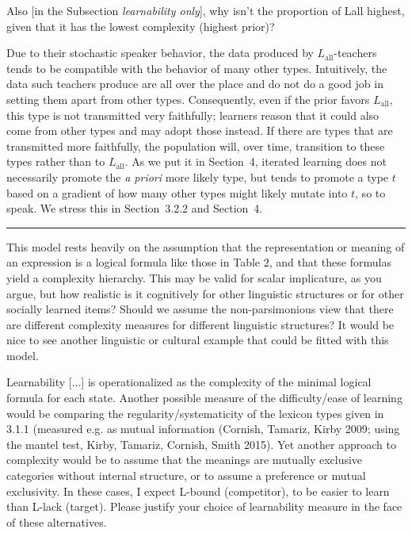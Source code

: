 \documentclass[12pt,a4paper]{article}
\begin{document}
\vspace{.5cm}
\begin{mdframed}[backgroundcolor=gray!25,linecolor=gray!25]
Also [in the Subsection {\em learnability only}], why isn't the proportion of Lall highest, given that it has the lowest complexity (highest prior)?
\end{mdframed}
%
Due to their stochastic speaker behavior, the data produced by $L_{\text{all}}$-teachers tends to be compatible with the behavior of many other types. Intuitively, the data such teachers produce are all over the place and do not do a good job in setting them apart from other types. Consequently, even if the prior favors $L_{\text{all}}$, this type is not transmitted very faithfully; learners reason that it could also come from other types and may adopt those instead. If there are types that are transmitted more faithfully, the population will, over time, transition to these types rather than to $L_{\text{all}}$. As we put it in Section~4, iterated learning does not necessarily promote the {\em a priori} more likely type, but tends to promote a type $t$ based on a gradient of how many other types might likely mutate into $t$, so to speak. We stress this in Section~3.2.2 and Section~4.

\vspace{1cm}
\noindent\rule{\textwidth}{1pt}

\begin{mdframed}[backgroundcolor=gray!25,linecolor=gray!25,frametitle= Reviewer \thereviewerCounter~comment \thereviewerCommentCounter \hfill ~~({\it LOT \& model relation})]
%
This model rests heavily on the assumption that the representation or meaning of an expression is a logical formula like those in Table 2, and that these formulas yield a complexity hierarchy.  This may be valid for scalar implicature, as you argue, but how realistic is it cognitively for other linguistic structures or for other socially learned items? Should we assume the non-parsimonious view that there are different complexity measures for different linguistic structures? It would be nice to see another linguistic or cultural example that could be fitted with this model.
%
\end{mdframed}

\begin{mdframed}[backgroundcolor=gray!25,linecolor=gray!25]
Learnability [...] is operationalized as the complexity of the minimal logical formula for each state. Another possible measure of the difficulty/ease of learning would be comparing the regularity/systematicity of the lexicon types given in 3.1.1 (measured e.g. as mutual information (Cornish, Tamariz, Kirby 2009; using the mantel test, Kirby, Tamariz, Cornish, Smith 2015). Yet another approach to complexity would be to assume that the meanings are mutually exclusive categories without internal structure, or to assume a preference or mutual exclusivity. In these cases, I expect L-bound (competitor), to be easier to learn than L-lack (target). Please justify your choice of learnability measure in the face of these alternatives.
\end{mdframed}
\end{document}
